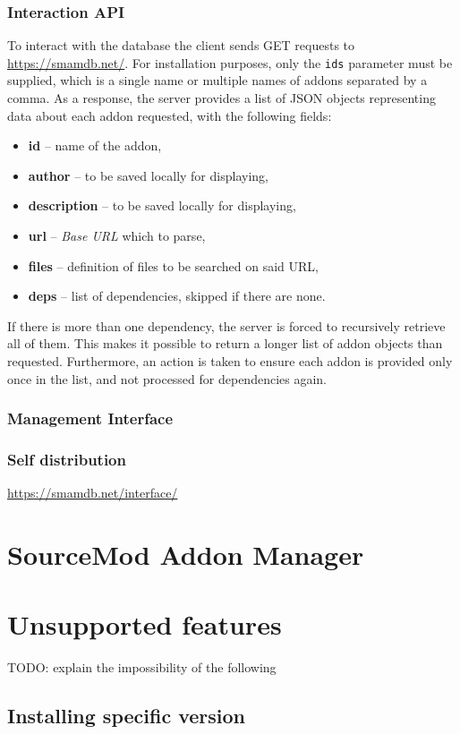 \subsubsection{Interaction API}

To interact with the database the client sends GET requests to \url{https://smamdb.net/}.
For installation purposes, only the \verb|ids| parameter must be supplied, which is a single name or multiple names of addons separated by a comma.
As a response, the server provides a list of JSON objects representing data about each addon requested, with the following fields:
\begin{itemize}
    \item \textbf{id} -- name of the addon,
    \item \textbf{author} -- to be saved locally for displaying,
    \item \textbf{description} -- to be saved locally for displaying,
    \item \textbf{url} -- \textit{Base URL} which to parse,
    \item \textbf{files} -- definition of files to be searched on said URL,
    \item \textbf{deps} -- list of dependencies, skipped if there are none.
\end{itemize}

If there is more than one dependency, the server is forced to recursively retrieve all of them.
This makes it possible to return a longer list of addon objects than requested.
Furthermore, an action is taken to ensure each addon is provided only once in the list, and not processed for dependencies again.

\subsubsection{Management Interface}

\subsubsection{Self distribution}

\url{https://smamdb.net/interface/}

\section{SourceMod Addon Manager}

\section{Unsupported features}

TODO: explain the impossibility of the following

\subsection{Installing specific version}
